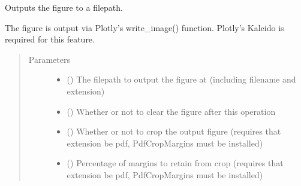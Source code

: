 \documentclass[letterpaper,10pt,english]{sphinxmanual}
\begin{document}
\begin{fulllineitems}
\begin{fulllineitems}
\end{fulllineitems}


\begin{fulllineitems}
\label{\detokenize{builder:geohexviz.builder.PlotBuilder.output}}
\sphinxAtStartPar
Outputs the figure to a filepath.

\sphinxAtStartPar
The figure is output via Plotly’s write\_image() function.
Plotly’s Kaleido is required for this feature.
\begin{quote}\begin{description}
\item[{Parameters}] \leavevmode\begin{itemize}
\item {} 
\sphinxAtStartPar
{} () \textendash{} The filepath to output the figure at (including filename and extension)

\item {} 
\sphinxAtStartPar
{} () \textendash{} Whether or not to clear the figure after this operation

\item {} 
\sphinxAtStartPar
{} () \textendash{} Whether or not to crop the output figure (requires that extension be pdf, PdfCropMargins must be installed)

\item {} 
\sphinxAtStartPar
{} (\sphinxstyleliteralemphasis{\sphinxupquote{, }}\sphinxstyleliteralemphasis{\sphinxupquote{, }}) \textendash{} Percentage of margins to retain from crop (requires that extension be pdf, PdfCropMargins must be installed)


\end{itemize}
\end{description}
\end{quote}
\end{fulllineitems}
\end{fulllineitems}
\end{document}
